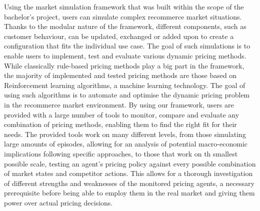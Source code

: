 Using the market simulation framework that was built within the scope of the bachelor's project, users can simulate complex recommerce market situations. Thanks to the modular nature of the framework, different components, such as customer behaviour, can be updated, exchanged or added upon to create a configuration that fits the individual use case. The goal of such simulations is to enable users to implement, test and evaluate various dynamic pricing methods. While classically rule-based pricing methods play a big part in the framework, the majority of implemented and tested pricing methods are those based on Reinforcement learning algorithms, a machine learning technology. The goal of using such algorithms is to automate and optimise the dynamic pricing problem in the recommerce market environment. By using our framework, users are provided with a large number of tools to monitor, compare and evaluate any combination of pricing methods, enabling them to find the right fit for their needs. The provided tools work on many different levels, from those simulating large amounts of episodes, allowing for an analysis of potential macro-economic implications following specific approaches, to those that work on th smallest possible scale, testing an agent's pricing policy against every possible combination of market states and competitor actions. This allows for a thorough investigation of different strengths and weaknesses of the monitored pricing agents, a necessary prerequisite before being able to employ them in the real market and giving them power over actual pricing decisions.
